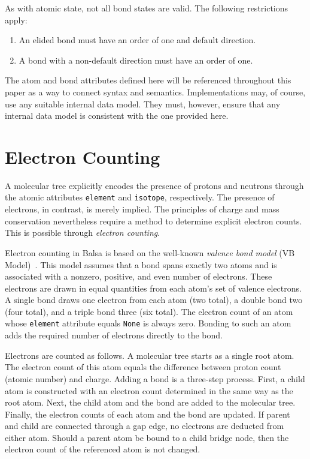 \documentclass{article}
\def\ttt{\texttt}
\begin{document}
As with atomic state, not all bond states are valid. The following restrictions apply:

\begin{enumerate}
    \item{An elided bond must have an order of one and default direction.}
    \item{A bond with a non-default direction must have an order of one.}
\end{enumerate}

The atom and bond attributes defined here will be referenced throughout this paper as a way to connect syntax and semantics. Implementations may, of course, use any suitable internal data model. They must, however, ensure that any internal data model is consistent with the one provided here.

\section*{Electron Counting}
\label{electron-counting}

A molecular tree explicitly encodes the presence of protons and neutrons through the atomic attributes \ttt{element} and \ttt{isotope}, respectively. The presence of electrons, in contrast, is merely implied. The principles of charge and mass conservation nevertheless require a method to determine explicit electron counts. This is possible through \textit{electron counting}. 

Electron counting in Balsa is based on the well-known \textit{valence bond model} (VB Model)~\cite{lewis:1916}. This model assumes that a bond spans exactly two atoms and is associated with a nonzero, positive, and even number of electrons. These electrons are drawn in equal quantities from each atom's set of valence electrons. A single bond draws one electron from each atom (two total), a double bond two (four total), and a triple bond three (six total). The electron count of an atom whose \ttt{element} attribute equals \ttt{None} is always zero. Bonding to such an atom adds the required number of electrons directly to the bond.

Electrons are counted as follows. A molecular tree starts as a single root atom. The electron count of this atom equals the difference between proton count (atomic number) and charge. Adding a bond is a three-step process. First, a child atom is constructed with an electron count determined in the same way as the root atom. Next, the child atom and the bond are added to the molecular tree. Finally, the electron counts of each atom and the bond are updated. If parent and child are connected through a gap edge, no electrons are deducted from either atom. Should a parent atom be bound to a child bridge node, then the electron count of the referenced atom is not changed.
\end{document}
